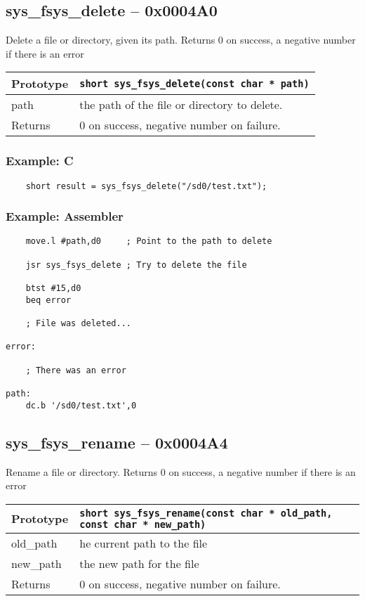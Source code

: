 \subsection*{sys\_fsys\_delete -- 0x0004A0}
Delete a file or directory, given its path. Returns 0 on success, a negative number if there is an error

\bigskip

\begin{tabular}{|l||l|} \hline
Prototype & \lstinline!short sys_fsys_delete(const char * path)! \\ \hline
path & the path of the file or directory to delete. \\ \hline
Returns & 0 on success, negative number on failure. \\ \hline
\end{tabular}

\subsubsection*{Example: C}
\begin{lstlisting}
    short result = sys_fsys_delete("/sd0/test.txt");
\end{lstlisting}

\subsubsection*{Example: Assembler}
\begin{verbatim}
    move.l #path,d0     ; Point to the path to delete

    jsr sys_fsys_delete ; Try to delete the file

    btst #15,d0
    beq error

    ; File was deleted...

error:

    ; There was an error

path:
    dc.b '/sd0/test.txt',0
\end{verbatim}


\subsection*{sys\_fsys\_rename -- 0x0004A4}
Rename a file or directory. Returns 0 on success, a negative number if there is an error

\bigskip

\begin{tabular}{|l||l|} \hline
Prototype & \lstinline!short sys_fsys_rename(const char * old_path, const char * new_path)! \\ \hline
old\_path & he current path to the file \\ \hline
new\_path & the new path for the file \\ \hline
Returns & 0 on success, negative number on failure. \\ \hline
\end{tabular}

